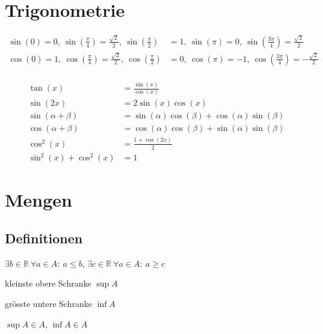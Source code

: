 \documentclass[11pt]{article}
\begin{document}
\section{Trigonometrie}

\begin{equation*}
\begin{split}
	\sin(0) = 0,\ \sin(\frac{\pi}{4}) = \frac{\sqrt{2}}{2},\ \sin(\frac{\pi}{2}) & = 1,\ \sin(\pi) = 0,\ \sin(\frac{3\pi}{4}) = \frac{\sqrt{2}}{2}\\
	\cos(0) = 1,\ \cos(\frac{\pi}{4}) = \frac{\sqrt{2}}{2},\ \cos(\frac{\pi}{2}) & = 0,\ \cos(\pi) = -1,\ \cos(\frac{3\pi}{4}) = -\frac{\sqrt{2}}{2}\\
\end{split}
\end{equation*}

\begin{equation*}
\begin{split}
	\tan(x) & = \frac{\sin(x)}{\cos(x)} \\
	\sin(2x) & = 2\sin(x)\cos(x) \\
	\sin(\alpha + \beta) & = \sin(\alpha)\cos(\beta) + \cos(\alpha)\sin(\beta) \\
	\cos(\alpha + \beta) & = \cos(\alpha)\cos(\beta) + \sin(\alpha)\sin(\beta) \\
	\cos^2(x) & = \frac{1 + \cos(2x)}{2} \\
	\sin^2(x) + \cos^2(x) & = 1
\end{split}
\end{equation*}

\section{Mengen}

\subsection{Definitionen}

\begin{description}[labelindent=16pt,style=multiline,leftmargin=6cm, noitemsep]
	\item[Obere/Untere Schranke:] $\exists b \in \mathbb{R}\ \forall a\in A:\ a \leq b$, $\exists c \in \mathbb{R}\ \forall a\in A:\ a \geq c$
	\item[Supremum:] kleinste obere Schranke $\sup A$
	\item[Infimum:] gr{\"o}sste untere Schranke $\inf A$
	\item[Maximum/Minimum:] $\sup A \in A$, $\inf A \in A$
\end{description}
\end{document}
